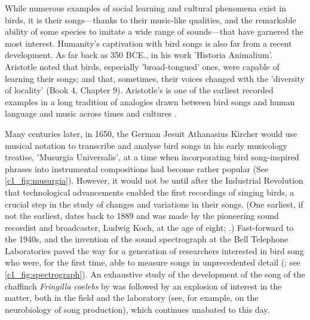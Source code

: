 While numerous examples of social learning and cultural phenomena exist in birds, it is their songs---thanks to their music-like qualities, and the remarkable ability of some species to imitate a wide range of sounds---that have garnered the most interest. Humanity’s captivation with bird songs is also far from a recent development. As far back as 350 BCE., in his work 'Historia Animalium'. Aristotle noted that birds, especially 'broad-tongued’ ones, were capable of learning their songs; and that, sometimes, their voices changed with the 'diversity of locality’ (Book 4, Chapter 9). Aristotle’s is one of the earliest recorded examples in a long tradition of analogies drawn between bird songs and human language and music across times and cultures \autocite{kleczkowska2015,zirin1980}.

Many centuries later, in 1650, the German Jesuit Athanasius Kircher would use musical notation to transcribe and analyse bird songs in his early musicology treatise, 'Musurgia Universalis', at a time when incorporating bird song-inspired phrases into instrumental compositions had become rather popular (See \autoref{c1_fig:musurgia}). However, it would not be until after the Industrial Revolution that technological advancements enabled the first recordings of singing birds, a crucial step in the study of changes and variations in their songs. (One earliest, if not the earliest, dates back to 1889 and was made by the pioneering sound recordist and broadcaster, Ludwig Koch, at the age of eight; \cite{britishlibrary2023}.) Fast-forward to the 1940s, and the invention of the sound spectrograph at the Bell Telephone Laboratories paved the way for a generation of researchers interested in bird song who were, for the first time, able to measure songs in unprecedented detail (\cite{baker2001a,koenig1946}; see \autoref{c1_fig:spectrograph}). An exhaustive study of the development of the song of the chaffinch \textit{Fringilla coelebs} by \textcite{thorpe1958} was followed by an explosion of interest in the matter, both in the field \autocite{Marler1962,marler1964} and the laboratory (see, for example, \cite{nottebohm1976} on the neurobiology of song production), which continues unabated to this day.

